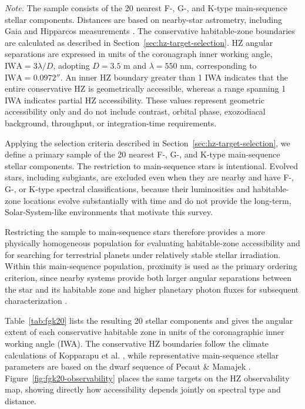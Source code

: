 \begin{table}[htbp]
\vspace{0.5em}
\begin{minipage}{0.96\linewidth}
\footnotesize
\textit{Note.} The sample consists of the 20 nearest F-, G-, and K-type
main-sequence stellar components. Distances are based on nearby-star
astrometry, including Gaia and Hipparcos measurements \cite{Gaia2022}.
The conservative habitable-zone boundaries are calculated as described
in Section~\ref{sec:hz-target-selection}. HZ angular separations are
expressed in units of the coronagraph inner working angle,
$\mathrm{IWA}=3\lambda/D$, adopting $D=3.5$ m and $\lambda=550$ nm,
corresponding to $\mathrm{IWA}=0.0972''$. An inner HZ boundary greater
than 1 IWA indicates that the entire conservative HZ is geometrically
accessible, whereas a range spanning 1 IWA indicates partial HZ
accessibility. These values represent geometric accessibility only and
do not include contrast, orbital phase, exozodiacal background,
throughput, or integration-time requirements.
\end{minipage}
\end{table}

Applying the selection criteria described in Section~\ref{sec:hz-target-selection}, we define a primary
sample of the 20 nearest F-, G-, and K-type main-sequence stellar components.
The restriction to main-sequence stars is intentional. Evolved stars, including
subgiants, are excluded even when they are nearby and have F-, G-, or K-type
spectral classifications, because their luminosities and habitable-zone locations
evolve substantially with time \cite{DanchiLopez2013} and do not provide the
long-term, Solar-System-like environments that motivate this survey.

Restricting the sample to main-sequence stars therefore provides a more physically
homogeneous population for evaluating habitable-zone accessibility and for searching
for terrestrial planets under relatively stable stellar irradiation. Within this
main-sequence population, proximity is used as the primary ordering criterion,
since nearby systems provide both larger angular separations between the star and
its habitable zone and higher planetary photon fluxes for subsequent characterization
\cite{Tuchow2024}.

Table~\ref{tab:fgk20} lists the resulting 20 stellar components and gives the angular extent of
each conservative habitable zone in units of the coronagraphic inner working angle
(IWA). The conservative HZ boundaries follow the climate calculations of
Kopparapu et al. \cite{kopparapu13,kopparapu14}, while representative
main-sequence stellar parameters are based on the dwarf sequence of
Pecaut \& Mamajek \cite{pecaut13}. Figure~\ref{fig:fgk20-observability} places the same targets
on the HZ observability map, showing directly how accessibility depends jointly
on spectral type and distance.

